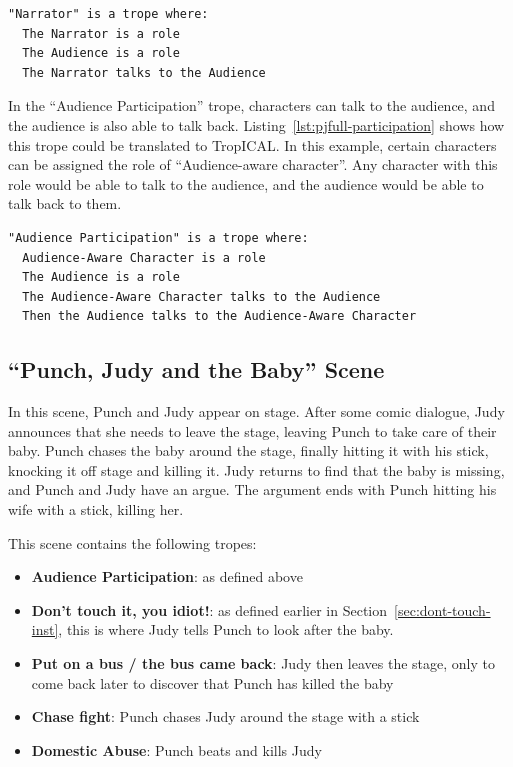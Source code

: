 \documentclass[11pt]{report}
\begin{document}
\begin{lstlisting}[showstringspaces=false, label={lst:pjfull-narrator}, caption={The ``Narrator'' trope}]
"Narrator" is a trope where:
  The Narrator is a role
  The Audience is a role
  The Narrator talks to the Audience
\end{lstlisting}

In the ``Audience Participation'' trope, characters can talk to the audience,
and the audience is also able to talk back.
Listing~\ref{lst:pjfull-participation} shows how this trope could be translated
to TropICAL. In this example, certain characters can be assigned the role of
``Audience-aware character''. Any character with this role would be able to talk
to the audience, and the audience would be able to talk back to them.

\begin{lstlisting}[showstringspaces=false, label={lst:pjfull-participation}, caption={The ``Audience Participation'' trope}]
"Audience Participation" is a trope where:
  Audience-Aware Character is a role
  The Audience is a role
  The Audience-Aware Character talks to the Audience
  Then the Audience talks to the Audience-Aware Character
\end{lstlisting}

\subsection{``Punch, Judy and the Baby'' Scene}

In this scene, Punch and Judy appear on stage. After some comic dialogue, Judy
announces that she needs to leave the stage, leaving Punch to take care of their
baby. Punch chases the baby around the stage, finally hitting it with his stick,
knocking it off stage and killing it. Judy returns to find that the baby is
missing, and Punch and Judy have an argue. The argument ends with Punch hitting
his wife with a stick, killing her.

This scene contains the following tropes:

\begin{itemize}
\item \textbf{Audience Participation}: as defined above
\item \textbf{Don't touch it, you idiot!}: as defined earlier in
Section~\ref{sec:dont-touch-inst}, this is where Judy tells Punch to look after
the baby.
\item \textbf{Put on a bus / the bus came back}: Judy then leaves the stage, only to
come back later to discover that Punch has killed the baby
\item \textbf{Chase fight}: Punch chases Judy around the stage with a stick
\item \textbf{Domestic Abuse}: Punch beats and kills Judy
\end{itemize}
\end{document}
